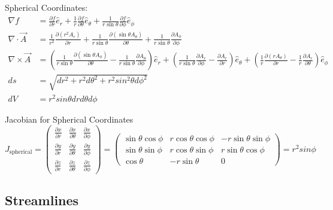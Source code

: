 \documentclass{book}
\begin{document}
Spherical Coordinates:
\begin{align*}
	\nabla f &= \frac{\partial f}{\partial r} \hat{e}_r + \frac{1}{r} \frac{\partial f}{\partial \theta} \hat{e}_\theta + \frac{1}{r \sin \theta} \frac{\partial f}{\partial \phi} \hat{e}_\phi \\
	\nabla \cdot \vec{A} &= \frac{1}{r^2} \frac{\partial (r^2 A_r)}{\partial r} + \frac{1}{r \sin \theta} \frac{\partial (\sin \theta A_\theta)}{\partial \theta} + \frac{1}{r \sin \theta} \frac{\partial A_\phi}{\partial \phi} \\
	\nabla \times \vec{A} &= \left( \frac{1}{r \sin \theta} \frac{\partial (\sin \theta A_\phi)}{\partial \theta} - \frac{1}{r \sin \theta} \frac{\partial A_\theta}{\partial \phi} \right) \hat{e}_r + \left( \frac{1}{r \sin \theta} \frac{\partial A_r}{\partial \phi} - \frac{\partial A_r}{\partial r} \right) \hat{e}_\theta + \left( \frac{1}{r} \frac{\partial (r A_\theta)}{\partial r} - \frac{1}{r} \frac{\partial A_r}{\partial \theta} \right) \hat{e}_\phi \\
	ds &= \sqrt{dr^2 + r^2 d\theta^2 + r^2 sin^2\theta d\phi^2} \\
	dV &= r^2 sin\theta dr d\theta d\phi
\end{align*}

Jacobian for Spherical Coordinates
\begin{equation*}
	J_{\text{spherical}} = \begin{pmatrix}
		\frac{\partial x}{\partial r} & \frac{\partial x}{\partial \theta} & \frac{\partial x}{\partial \phi} \\
		\frac{\partial y}{\partial r} & \frac{\partial y}{\partial \theta} & \frac{\partial y}{\partial \phi} \\
		\frac{\partial z}{\partial r} & \frac{\partial z}{\partial \theta} & \frac{\partial z}{\partial \phi}
	\end{pmatrix}
	= \begin{pmatrix}
		\sin \theta \cos \phi & r \cos \theta \cos \phi & -r \sin \theta \sin \phi \\
		\sin \theta \sin \phi & r \cos \theta \sin \phi & r \sin \theta \cos \phi \\
		\cos \theta & -r \sin \theta & 0
	\end{pmatrix} = r^2 sin \phi
\end{equation*}

\subsection{Streamlines}
\end{document}
